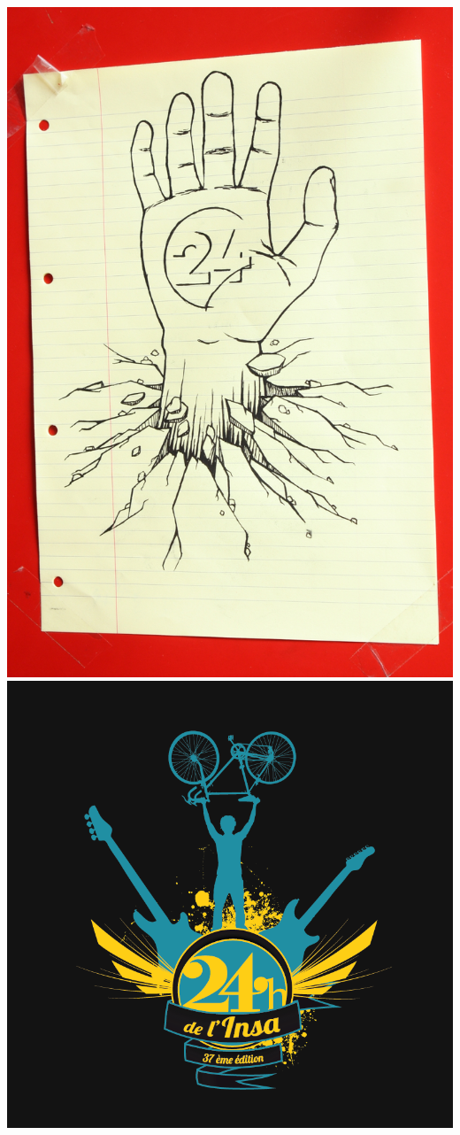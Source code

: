         \includegraphics[]{img/IMG_5848.JPG}
        \includegraphics[]{img/logo-TShirt-bichro.png}

